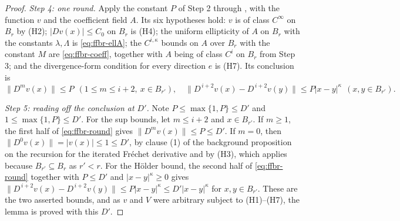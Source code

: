 \begin{proof}
\medskip\noindent\emph{Step 4: one round.}
Apply the constant $P$ of Step 2 through , with the function $v$ and the
coefficient field $A$.  Its six hypotheses hold: $v$ is of class $C^{\infty}$ on $B_r$ by (H2);
$\lvert Dv(x)\rvert\le C_0$ on $B_r$ is (H4); the uniform ellipticity of $A$ on $B_r$ with the
constants $\lambda,\Lambda$ is \eqref{eq:ffbr-ellA}; the $C^{i,\kappa}$ bounds on $A$ over $B_r$
with the constant $M$ are \eqref{eq:ffbr-coeff}, together with $A$ being of class $C^{i}$ on
$B_r$ from Step 3; and the divergence-form condition for every direction $e$ is (H7).  Its
conclusion is
\begin{equation}\label{eq:ffbr-round}
  \bigl\lVert D^{m}v(x)\bigr\rVert\le P\ \ (1\le m\le i+2,\ x\in B_{r'}),
  \quad
  \bigl\lVert D^{\,i+2}v(x)-D^{\,i+2}v(y)\bigr\rVert\le P\lvert x-y\rvert^{\kappa}
  \ \ (x,y\in B_{r'}).
\end{equation}

\medskip\noindent\emph{Step 5: reading off the conclusion at $D'$.}
Note $P\le\max\{1,P\}\le D'$ and $1\le\max\{1,P\}\le D'$.  For the sup bounds, let $m\le i+2$ and
$x\in B_{r'}$.  If $m\ge1$, the first half of \eqref{eq:ffbr-round} gives
$\lVert D^{m}v(x)\rVert\le P\le D'$.  If $m=0$, then
$\lVert D^{0}v(x)\rVert=\lvert v(x)\rvert\le1\le D'$, by clause (1) of the background proposition
on the recursion for the iterated Fr\'echet derivative and by (H3), which applies because
$B_{r'}\subseteq B_r$ as $r'<r$.  For the H\"older bound, the second half of
\eqref{eq:ffbr-round} together with $P\le D'$ and $\lvert x-y\rvert^{\kappa}\ge0$ gives
$\lVert D^{\,i+2}v(x)-D^{\,i+2}v(y)\rVert\le P\lvert x-y\rvert^{\kappa}\le
D'\lvert x-y\rvert^{\kappa}$ for $x,y\in B_{r'}$.  These are the two asserted bounds, and as $v$
and $V$ were arbitrary subject to (H1)--(H7), the lemma is proved with this $D'$.
\end{proof}
